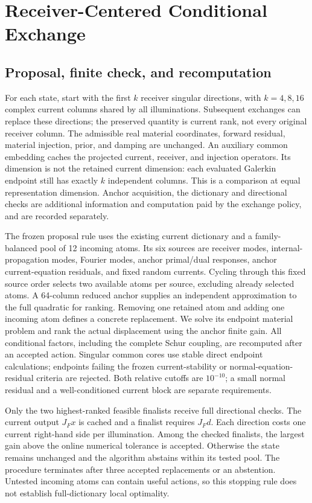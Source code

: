 \section{Receiver-Centered Conditional Exchange}
\subsection{Proposal, finite check, and recomputation}
For each state, start with the first $k$ receiver singular directions, with $k=4,8,16$ complex current columns shared by all illuminations. Subsequent exchanges can replace these directions; the preserved quantity is current rank, not every original receiver column. The admissible real material coordinates, forward residual, material injection, prior, and damping are unchanged. An auxiliary common embedding caches the projected current, receiver, and injection operators. Its dimension is not the retained current dimension: each evaluated Galerkin endpoint still has exactly $k$ independent columns. This is a comparison at equal representation dimension. Anchor acquisition, the dictionary and directional checks are additional information and computation paid by the exchange policy, and are recorded separately.

The frozen proposal rule uses the existing current dictionary and a family-balanced pool of 12 incoming atoms. Its six sources are receiver modes, internal-propagation modes, Fourier modes, anchor primal/dual responses, anchor current-equation residuals, and fixed random currents. Cycling through this fixed source order selects two available atoms per source, excluding already selected atoms. A 64-column reduced anchor supplies an independent approximation to the full quadratic for ranking. Removing one retained atom and adding one incoming atom defines a concrete replacement. We solve its endpoint material problem and rank the actual displacement using the anchor finite gain. All conditional factors, including the complete Schur coupling, are recomputed after an accepted action. Singular common cores use stable direct endpoint calculations; endpoints failing the frozen current-stability or normal-equation-residual criteria are rejected. Both relative cutoffs are $10^{-10}$; a small normal residual and a well-conditioned current block are separate requirements.

Only the two highest-ranked feasible finalists receive full directional checks. The current output $J_Fx$ is cached and a finalist requires $J_Fd$. Each direction costs one current right-hand side per illumination. Among the checked finalists, the largest gain above the online numerical tolerance is accepted. Otherwise the state remains unchanged and the algorithm abstains within its tested pool. The procedure terminates after three accepted replacements or an abstention. Untested incoming atoms can contain useful actions, so this stopping rule does not establish full-dictionary local optimality.

